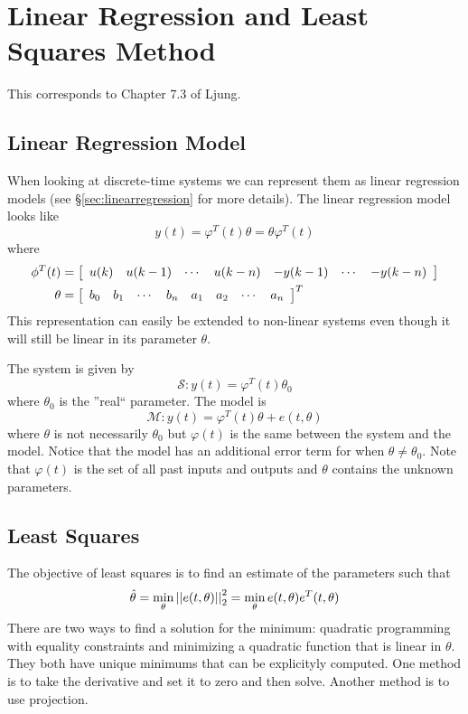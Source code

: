 \section{Linear Regression and Least Squares Method}
This corresponds to Chapter 7.3 of Ljung.

\subsection{Linear Regression Model}
When looking at discrete-time systems we can represent them as linear regression models (see \S\ref{sec:linearregression} for more details). The linear regression model looks like
$$y(t) = \varphi^T(t)\theta = \theta\varphi^T(t)$$
where
\begin{align*}
\phi^T(t) &= \left[\begin{array}{c c c c c c c}
u(k) & u(k-1) & \cdots & u(k-n) & -y(k-1) & \cdots & -y(k-n) \end{array}\right] \\
\theta &= \left[\begin{array}{c c c c c c c c}
b_0 & b_1 & \cdots & b_n & a_1 & a_2 & \cdots & a_n \end{array}\right]^T
\end{align*}
This representation can easily be extended to non-linear systems even though it will still be linear in its parameter $\theta$.

The system is given by
$$\mathcal{S}: y(t) = \varphi^T(t)\theta_0$$
where $\theta_0$ is the ''real`` parameter. The model is
$$\mathcal{M}: y(t) = \varphi^T(t)\theta + e(t,\theta)$$
where $\theta$ is not necessarily $\theta_0$ but $\varphi(t)$ is the same between the system and the model. Notice that the model has an additional error term for when $\theta\neq\theta_0$. Note that $\varphi(t)$ is the set of all past inputs and outputs and $\theta$ contains the unknown parameters.

\subsection{Least Squares}
The objective of least squares is to find an estimate of the parameters such that
$$\hat{\theta} = \min_\theta\left|\left|e(t,\theta)\right|\right|_2^2 = \min_\theta e(t,\theta)e^T(t,\theta)$$
There are two ways to find a solution for the minimum: quadratic programming with equality constraints and minimizing a quadratic function that is linear in $\theta$. They both have unique minimums that can be explicityly computed. One method is to take the derivative and set it to zero and then solve. Another method is to use projection.

